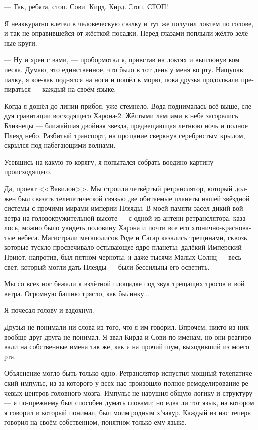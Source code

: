 \documentclass[a4paper,12pt,fleqn]{book}\usepackage{polyglossia}\setdefaultlanguage[babelshorthands=true]{russian}\setotherlanguage{english}\defaultfontfeatures{Ligatures=TeX,Mapping=tex-text}
\newcommand{\asterism}{\vspace{1em}{\centering\Large\bfseries$\ast~\ast~\ast$\par}\vspace{1em}}
\begin{document}
--- Так, ребята, стоп.
Сови.
Кирд.
Кирд.
Стоп.
СТОП!

Я неаккуратно влетел в человеческую свалку и тут же получил локтем по голове, и так не оправившейся от жёсткой посадки.
Перед глазами поплыли жёлто-зелёные круги.

--- Ну и хрен с вами, --- пробормотал я, привстав на локтях и выплюнув ком песка.
Думаю, это единственное, что было в тот день у меня во рту.
Нащупав палку, я кое-как поднялся на ноги и пошёл к морю, пока друзья продолжали препираться --- каждый на своём языке.

Когда я дошёл до линии прибоя, уже стемнело.
Вода поднималась всё выше, следуя гравитации восходящего Харона-2.
Жёлтыми лампами в небе загорелись Близнецы --- ближайшая двойная звезда, предвещающая летнюю ночь и полное Плеяд небо.
Разбитый транспорт, на прощание сверкнув серебристым крылом, скрылся под набегающими волнами.

\asterism

Усевшись на какую-то корягу, я попытался собрать воедино картину происходящего.

Да, проект <<Вавилон>>.
Мы строили четвёртый ретранслятор, который должен был связать телепатической связью две обитаемые планеты нашей звёздной системы с прочими мирами империи Плеяды.
В моей памяти засел дикий вой ветра на головокружительной высоте --- с одной из антенн ретранслятора, казалось, можно было увидеть половину Харона и почти все его хтонично-красноватые небеса.
Магистрали мегаполисов Роде и Сагар казались трещинами, сквозь которые тускло просвечивало остывающее ядро планеты;
далёкий Имперский Приют, напротив, был пятном черноты, и даже тысячи Малых Солнц --- весь свет, который могли дать Плеяды --- были бессильны его осветить.

Мы со всех ног бежали к взлётной площадке под звук трещащих тросов и вой ветра.
Огромную башню трясло, как былинку...

Я почесал голову и вздохнул.

Друзья не понимали ни слова из того, что я им говорил.
Впрочем, никто из них вообще друг друга не понимал.
Я звал Кирда и Сови по именам, но они реагировали на собственные имена так же, как и на прочий шум, выходивший из моего рта.

Объяснение могло быть только одно.
Ретранслятор испустил мощный телепатический импульс, из-за которого у всех нас произошло полное ремоделирование речевых центров головного мозга.
Импульс не нарушил общую логику и структуру --- я по-прежнему был способен думать словами;
но едва ли тот язык, на котором я говорил и который понимал, был моим родным х'эакур.
Каждый из нас теперь говорил на своём собственном, понятном только ему языке.
\end{document}
